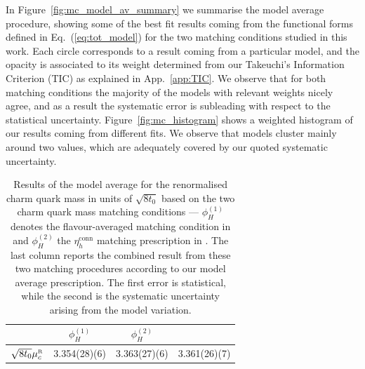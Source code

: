 In Figure~\ref{fig:mc_model_av_summary} we summarise the model average procedure, showing some of the best  
fit results coming from the functional forms defined in Eq.~(\ref{eq:tot_model}) for the two
 matching 
conditions studied in this work. Each circle corresponds to a result coming from  a particular model, and 
the opacity is associated to its weight determined from our Takeuchi's Information Criterion (TIC)  as explained in App.~\ref{app:TIC}.  We observe that for both
matching conditions the majority of the models with relevant weights nicely agree, and as a result the 
systematic error is subleading with respect to the statistical uncertainty. Figure~\ref{fig:mc_histogram}  shows a weighted histogram of our results 
coming from different fits. We observe that models cluster mainly around two values, which are adequately
covered by our quoted systematic uncertainty. 


\begin{table}[t!]
	\begin{center}	
		\begin{tabular}{c ||  c c  c  }
			\hline
			 &  $\phi_{H}^{(1)}$ & $\phi_{H}^{(2)} $  &   \text{combined} \\ [0.5ex]
			\hline\hline
			$\sqrt{8t_0}\mu_c^{\rm\scriptscriptstyle R}$ & 3.354(28)(6) & 3.363(27)(6)  &   3.361(26)(7)   
		\end{tabular}
		\caption{Results of the model average for the renormalised charm quark mass  in units of $\sqrt{8t_0}$ based on the two
		 charm quark mass matching conditions --- $\phi_H^{(1)}$ denotes the flavour-averaged matching 
		 condition in  and  $\phi_H^{(2)}$ the $\eta_h^{\mathrm{conn}}$ matching prescription in 
		 . The last column reports the combined result from these two matching procedures according to our model average prescription. The first error is 
		 statistical, while the second is the systematic uncertainty arising from the model variation.
                }
		\label{tab:mc_results_all_matching}
	\end{center}
\end{table}


